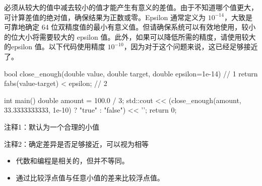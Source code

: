 必须从较大的值中减去较小的值才能产生有意义的差值。由于不知道哪个值更大，可计算差值的绝对值，确保结果为正数或零。Epsilon 通常定义为 $10^{-14}$，大致是可靠地确定 64 位双精度值的最小有意义值。但请确保系统可以有效地使用，较小的位大小将需要较大的 epsilon 值。此外，如果可以降低所需的精度，请使用较大的epsilon 值。以下代码使用精度 $10^{-10}$，因为对于这个问题来说，这已经足够接近了。


\begin{cpp}
bool close_enough(double value, double target, double epsilon=1e-14) { // 1
  return fabs(value-target) < epsilon; // 2
}

int main() {
  double amount = 100.0 / 3;
  std::cout << (close_enough(amount, 33.3333333333, 1e-10) ? "true" : "false") << '\n';
  return 0;
}
\end{cpp}

{\footnotesize
注释1：默认为一个合理的小值

注释2：确定差异是否足够接近，可以视为相等
}


\begin{itemize}
\item
代数和编程是相关的，但并不等同。

\item
通过比较浮点值与任意小值的差来比较浮点值。
\end{itemize}
